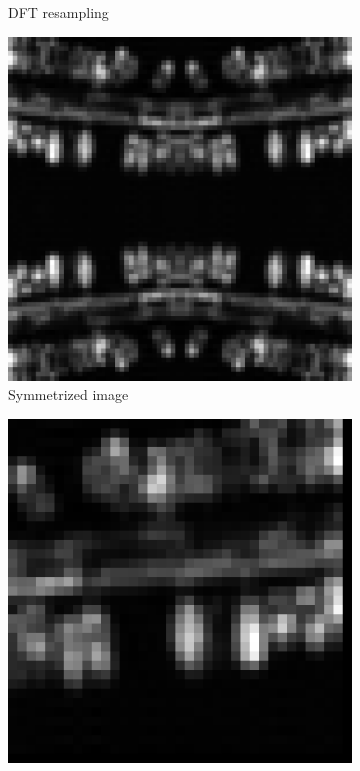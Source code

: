 \begin{figure}[htpb]
\begin{subfigure}[b]{0.24\textwidth}
  \caption{DFT resampling}
  \label{fig:fftresampling}
  \end{subfigure}
  \begin{subfigure}[b]{0.24\textwidth}
  \centering
  \includegraphics[width=\textwidth]{img/imOrigSymmetric}
  \caption{Symmetrized image}
  \end{subfigure}
  \begin{subfigure}[b]{0.24\textwidth}
  \centering
  \includegraphics[width=\textwidth]{img/imAfterResamplingDCT}

\end{subfigure}
\end{figure}
